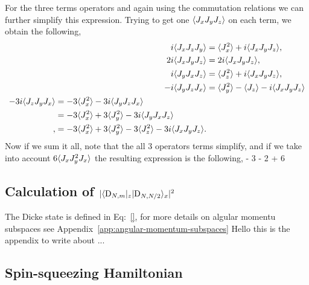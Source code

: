 For the three terms operators and again using the commutation relations we can further simplify this expression. Trying to get one $\langle J_xJ_yJ_z \rangle$ on each term, we obtain the following,
\begin{subequations}
\begin{align}
  i\langle J_xJ_zJ_y \rangle & = \langle J_x^2 \rangle+i\langle J_xJ_yJ_z \rangle,
  \label{eq:ap-last-terms-1} \\
  2i\langle J_xJ_yJ_z \rangle & = 2i\langle J_xJ_yJ_z \rangle,
  \label{eq:ap-last-term-2} \\
  i\langle J_yJ_xJ_z \rangle & = \langle J_z^2 \rangle+i\langle J_xJ_yJ_z \rangle,
  \label{eq:ap-simplification-3} \\
  -i\langle J_yJ_zJ_x \rangle & = \langle J_y^2 \rangle - \langle J_z \rangle - i\langle J_xJ_yJ_z \rangle \\
\begin{split}
  -3i\langle J_zJ_yJ_x \rangle & = -3\langle J_x^2 \rangle - 3i \langle J_yJ_zJ_x \rangle \\
  & = -3\langle J_x^2 \rangle + 3 \langle J_y^2 \rangle - 3i\langle J_yJ_xJ_z \rangle \\,
  & = -3\langle J_x^2 \rangle + 3 \langle J_y^2 \rangle - 3\langle J_z^2 \rangle
   - 3i \langle J_xJ_yJ_z \rangle.
  \label{eq:ap-simplification-4}
\end{split}
\end{align}
\end{subequations}
Now if we sum it all, note that the all 3 operators terms simplify, and if we take into account $6\langle J_xJ_y^2J_x \rangle$ the resulting expression is the following,
 - 3  - 2 + 6
\ee

\subsection{Calculation of $|\langle \textnormal{D}_{N,m} \vert_z\vert \textnormal{D}_{N,N/2} \rangle_x|^2$}
\label{app:calculation-dicke-overlap}

The Dicke state is defined in Eq:~\eqref{}, for more details on algular momentu subspaces see Appendix~\ref{app:angular-momentum-subspaces} 
Hello this is the appendix to write about ...

\subsection{Spin-squeezing Hamiltonian}
